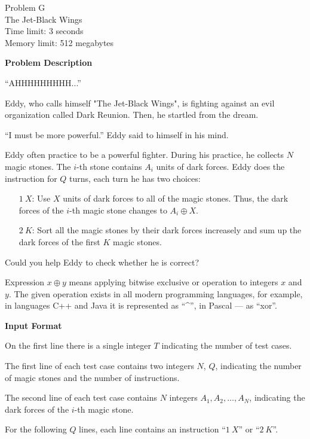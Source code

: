 \begin{center}
    {\LARGE Problem G}\vspace{1mm}\\
    {\Large The Jet-Black Wings}\\
    {Time limit: 3 seconds}\\
    {Memory limit: 512 megabytes}
\end{center}

\textbf{\large Problem Description}

``AHHHHHHHHH...''

Eddy, who calls himself "The Jet-Black Wings", is fighting against an evil organization called Dark
Reunion. Then, he startled from the dream.

``I must be more powerful.'' Eddy said to himself in his mind.

Eddy often practice to be a powerful fighter. During his practice, he collects $N$ magic stones. The
$i$-th stone contains $A_i$ units of dark forces. Eddy does the instruction for $Q$ turns, each turn
he has two choices:

\begin{itemize}
\item[$1\ X$:] Use $X$ units of dark forces to all of the magic stones. Thus, the dark forces of the
  $i$-th magic stone changes to $A_i \oplus X$.
\item[$2\ K$:] Sort all the magic stones by their dark forces increasely and sum up the dark forces
  of the first $K$ magic stones.
\end{itemize}

Could you help Eddy to check whether he is correct?

Expression $x \oplus y$ means applying bitwise exclusive or operation to integers $x$ and $y$.
The given operation exists in all modern programming languages, for example, in languages C++ and
Java it is represented as ``\^{}'', in Pascal — as ``xor''.

\textbf{\large Input Format}

On the first line there is a single integer $T$ indicating the number of test cases.

The first line of each test case contains two integers $N$, $Q$, indicating the
number of magic stones and the number of instructions.

The second line of each test case contains $N$ integers $A_1, A_2, \ldots, A_N$, indicating the dark
forces of the $i$-th magic stone.

For the following $Q$ lines, each line contains an instruction ``$1\ X$'' or ``$2\ K$''.

